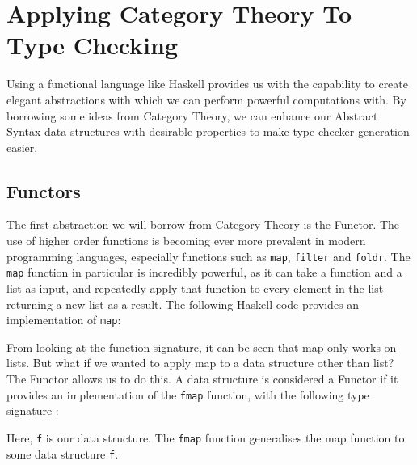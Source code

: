 \documentclass{UoYCSproject}
\begin{document}
\section{Applying Category Theory To Type Checking}
\label{sec:CategoryTheory}
Using a functional language like Haskell provides us with the capability to
create elegant abstractions with which we can perform powerful computations
with. By borrowing some ideas from Category Theory, we can enhance our Abstract
Syntax data structures with desirable properties to make type checker generation
easier.

\subsection{Functors}
The first abstraction we will borrow from Category Theory is the Functor. The
use of higher order functions is becoming ever more prevalent in modern
programming languages, especially functions such as \lstinline{map},
\lstinline{filter} and \lstinline{foldr}. The \lstinline{map} function in
particular is incredibly powerful, as it can take a function and a list as
input, and repeatedly apply that function to every element in the list returning
a new list as a result. The following Haskell code provides an implementation
of \lstinline{map}:

From looking at the function signature, it can be seen that map only works on
lists. But what if we wanted to apply map to a data structure other than list?
The Functor allows us to do this. A data structure is considered a Functor if
it provides an implementation of the \lstinline{fmap} function, with the
following type signature \cite{HuttonHaskell}:

Here, \lstinline{f} is our data structure. The \lstinline{fmap} function
generalises the map function to some data structure \lstinline{f}. 
\end{document}
